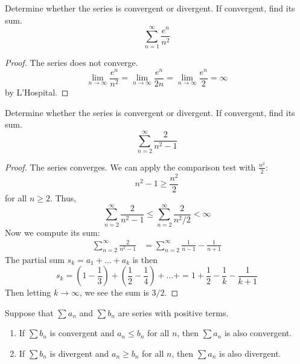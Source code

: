 \documentclass[openany]{book}
\begin{document}
\begin{prob}
    Determine whether the series is convergent or divergent. If convergent, find its sum.
    \[
    \sum_{n=1}^{\infty} \frac{e^n}{n^2}
    \]
\end{prob}
\begin{proof}
    The series does not converge.
    \begin{equation*}
        \lim_{n\to\infty}\frac{e^n}{n^2}=\lim_{n\to\infty}\frac{e^n}{2n}=\lim_{n\to\infty}\frac{e^n}{2}=\infty
    \end{equation*}
by L'Hospital.
\end{proof}


\begin{prob}
    Determine whether the series is convergent or divergent. If convergent, find its sum.
    \[
    \sum_{n=2}^{\infty} \frac{2}{n^2-1}
    \]
\end{prob}
\begin{proof}
    The series converges. We can apply the comparison test with $\frac{n^2}{2}$: 
    \begin{equation*}
        n^2-1\geq\frac{n^2}{2}
    \end{equation*}
    for all $n\geq 2$. Thus, 
    \begin{equation*}
        \sum_{n=2}^\infty\frac{2}{n^2-1}\leq\sum_{n=2}^\infty\frac{2}{n^2/2}<\infty
    \end{equation*}
    Now we compute its sum:
\begin{align*}
    \sum_{n=2}^{\infty} \frac{2}{n^2-1}&=\sum_{n=2}^\infty \frac{1}{n-1}-\frac{1}{n+1}
\end{align*}
The partial sum $s_k=a_1+\dots+a_k$ is then
\begin{equation*}
    s_k=\left(1-\frac{1}{3}\right)+\left(\frac{1}{2}-\frac{1}{4}\right)+\dots+=1+\frac{1}{2}-\frac{1}{k}-\frac{1}{k+1}
\end{equation*}
Then letting $k\to\infty$, we see the sum is $3/2$.
\end{proof}

\begin{prop}
    Suppose that $\sum a_n$ and $\sum b_n$ are series
with positive terms.

\begin{enumerate}
    \item[(i)] If $\sum b_n$ is convergent and
    $a_n \leq b_n$ for all $n$, then
    $\sum a_n$ is also convergent.

    \item[(ii)] If $\sum b_n$ is divergent and
    $a_n \geq b_n$ for all $n$, then
    $\sum a_n$ is also divergent.
\end{enumerate}
\end{prop}
\end{document}
